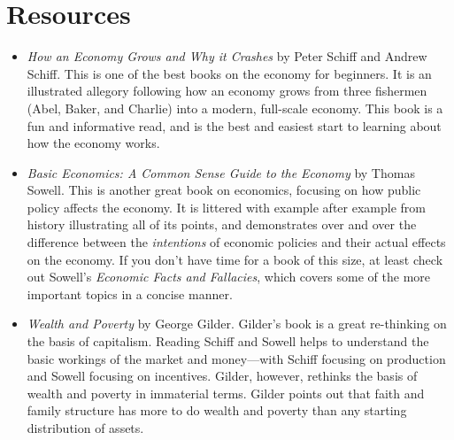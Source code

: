 \section{Resources}
\begin{itemize}
\item
\textit{How an Economy Grows and Why it Crashes} by Peter Schiff and Andrew Schiff.  
This is one of the best books on the economy for beginners.  It is an illustrated 
allegory following how an economy grows from three fishermen (Abel, Baker, and Charlie)
into a modern, full-scale economy.  This book is a fun and informative read, and is 
the best and easiest start to learning about how the economy works.
\item 
\textit{Basic Economics: A Common Sense Guide to the Economy} by Thomas
Sowell.  This is another great book on economics, focusing on how public policy
affects the economy.  It is littered with example after example from history
illustrating all of its points, and demonstrates over and over
the difference between the \textit{intentions} of economic policies and their
actual effects on the economy.  If you don't have time for a book of
this size, at least check out Sowell's
\textit{Economic Facts and Fallacies}, which covers some of the more
important topics in a concise manner.
\item
\textit{Wealth and Poverty} by George Gilder.  Gilder's book is a great 
re-thinking on the basis of capitalism.  Reading Schiff and Sowell 
helps to understand the basic workings of the market and
money---with Schiff focusing on production and Sowell focusing on incentives. 
Gilder, however, rethinks the basis of wealth and poverty in immaterial terms.
Gilder points out that faith and family structure has more to do wealth and
poverty than any starting distribution of assets.
\end{itemize}
